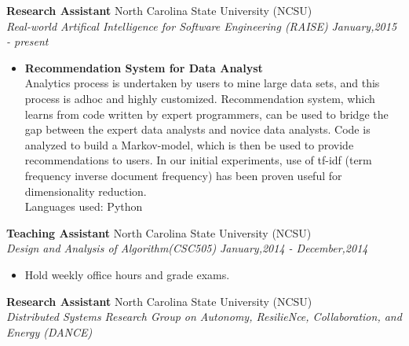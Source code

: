 \documentclass[margin,line]{res}
\begin{document}
\begin{resume}
{\bf Research Assistant} \hfill North Carolina State University (NCSU) \\
\textit{Real-world Artifical Intelligence for Software Engineering (RAISE)} 
\hspace{1cm} \hfill {\it January,2015 - present}
\begin{itemize}
	\item \textbf{Recommendation System for Data Analyst}\\
	Analytics process is undertaken by users to mine large data sets, and this process is adhoc and highly customized. Recommendation system, which learns from code written by expert
	programmers, can be used to bridge the gap between the expert data analysts and novice data analysts. Code is analyzed to build a Markov-model, which is then be used 
	to provide recommendations to users. In our initial experiments, use of tf-idf (term frequency inverse document frequency) has been proven useful for dimensionality 
	reduction.\\
	Languages used: Python\\
\end{itemize}

{\bf Teaching Assistant} \hfill North Carolina State University (NCSU) \\
\textit{Design and Analysis of Algorithm(CSC505)} \hspace{1cm} \hfill {\it January,2014 - December,2014}
	\begin{itemize}
		\setlength{\itemsep}{-10pt}
		\item Hold weekly office hours and grade exams.
	\end{itemize}

{\bf Research Assistant} \hfill North Carolina State University (NCSU) \\
\textit{Distributed Systems Research Group on Autonomy, ResilieNce, Collaboration, and Energy (DANCE)} 


\end{resume}
\end{document}
